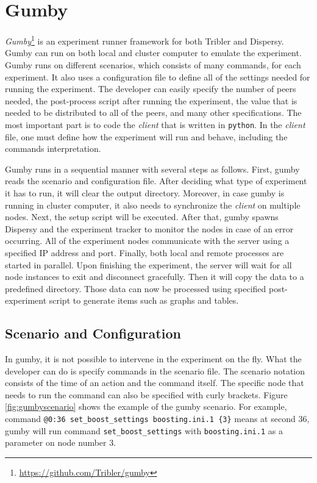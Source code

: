 \section{Gumby}
\label{section:gumby}
\textit{Gumby}\footnote{\url{https://github.com/Tribler/gumby}} is an experiment runner framework for both Tribler and Dispersy. Gumby can run on both local and cluster computer to emulate the experiment. Gumby runs on different scenarios, which consists of many commands, for each experiment. It also uses a configuration file to define all of the settings needed for running the experiment. The developer can easily specify the number of peers needed, the post-process script after running the experiment, the value that is needed to be distributed to all of the peers, and many other specifications. The most important part is to code the \textit{client} that is written in \texttt{python}. In the \textit{client} file, one must define how the experiment will run and behave, including the commands interpretation.

Gumby runs in a sequential manner with several steps as follows. First, gumby reads the scenario and configuration file. After deciding what type of experiment it has to run, it will clear the output directory. Moreover, in case gumby is running in cluster computer, it also needs to synchronize the \textit{client} on multiple nodes. Next, the setup script will be executed. After that, gumby spawns Dispersy and the experiment tracker to monitor the nodes in case of an error occurring. All of the experiment nodes communicate with the server using a specified IP address and port. Finally, both local and remote processes are started in parallel. Upon finishing the experiment, the server will wait for all node instances to exit and disconnect gracefully. Then it will copy the data to a predefined directory. Those data can now be processed using specified post-experiment script to generate items such as graphs and tables.

\subsection{Scenario and Configuration}
In gumby, it is not possible to intervene in the experiment on the fly. What the developer can do is specify commands in the scenario file. The scenario notation consists of the time of an action and the command itself. The specific node that needs to run the command can also be specified with curly brackets. Figure \ref{fig:gumbyscenario} shows the example of the gumby scenario. For example, command \texttt{@0:36 set\_boost\_settings boosting.ini.1 \{3\}} means at second 36, gumby will run command \texttt{set\_boost\_settings} with \texttt{boosting.ini.1} as a parameter on node number 3. 

